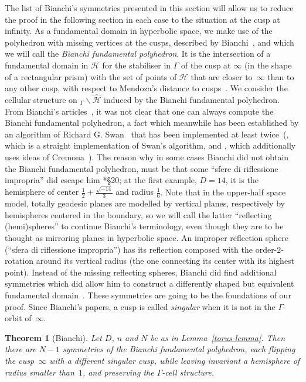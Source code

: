 \documentclass[twoside,a4paper,12 pt]{amsart}
\newcommand{\Hy}{\mathcal{H}}
\theoremstyle{plain}
\newtheorem{theorem}{Theorem}%
\theoremstyle{definition}
\theoremstyle{remark}
\begin{document}
The list of Bianchi's symmetries presented in this section will allow us to reduce the proof in the following section 
in each case to the situation at the cusp at infinity.
As a fundamental domain in hyperbolic space, we make use of the polyhedron with missing vertices at the cusps,
described by Bianchi~\cite{Bianchi1892}, and which we will call the \emph{Bianchi fundamental polyhedron}.
It is the intersection of a fundamental domain in $\Hy$ for the stabiliser in $\Gamma$ of the cusp at $\infty$ (in the shape of a rectangular prism) 
with the set of points of $\Hy$ that are closer to~$\infty$ than to any other cusp, with respect to Mendoza's distance to cusps~\cite{Mendoza}.
We consider the cellular structure on $_\Gamma \backslash \widehat{\Hy}$
induced by the Bianchi fundamental polyhedron.
From Bianchi's articles~\cites{Bianchi1892, Bianchi1893}, 
 it was not clear that one can always compute the Bianchi fundamental polyhedron, 
 a fact which meanwhile has been established by an algorithm of Richard G. Swan~\cite{Swan} 
 that has been implemented at least twice~(\cite{BianchiGP}, which is a straight implementation of Swan's algorithm,
 and \cites{Aranes, CremonaAranes}, which additionally uses ideas of Cremona~\cite{Cremona}).
The reason why in some cases Bianchi did not obtain the Bianchi fundamental polyhedron, 
must be that some ``sfere di riflessione impropria'' did escape him
\cite{Bianchi1892}*{\S 20; at the first example, $D = 14$, it is the hemisphere of center $\frac{1}{2}+\frac{\sqrt{-14}}{3}$
and radius $\frac{1}{6}$}.
Note that in the upper-half space model, totally geodesic planes are modelled by vertical planes, respectively by hemispheres centered in the boundary, so we will call the latter ``reflecting (hemi)spheres''
to continue Bianchi's terminology, even though they are to be thought as mirroring planes in hyperbolic space.
An improper reflection sphere (``sfera di riflessione impropria'') has its reflection composed with the order-$2$-rotation around its vertical radius (the one connecting its center with its highest point).
Instead of the missing reflecting spheres, Bianchi did find additional symmetries which did allow him to construct a differently shaped but equivalent fundamental domain~\cite{Bianchi1893}.
These symmetries are going to be the foundations of our proof.
Since Bianchi's papers, a cusp is called \textit{singular} 
when it is not in the $\Gamma$-orbit of~$\infty$. 
\begin{theorem}[Bianchi] \label{Bianchi statement}
 Let $D$, $n$ and $N$ be as in Lemma~\ref{torus-lemma}.
Then there are $N-1$ symmetries of the Bianchi fundamental polyhedron, each flipping the cusp~$\infty$ with a different singular cusp,
while leaving invariant a hemisphere of radius smaller than~$1$,
and preserving the $\Gamma$-cell structure.
\end{theorem}
\end{document}
